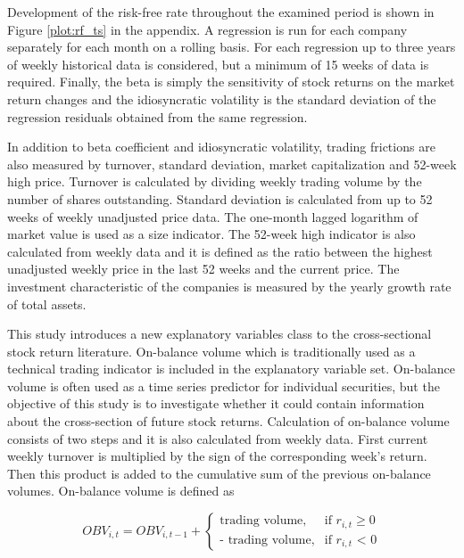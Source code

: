 \documentclass[12pt]{article}
\begin{document}
Development of the risk-free rate throughout the examined period is shown in Figure \ref{plot:rf_ts} in the appendix. A regression is run for each company separately for each month on a rolling basis. For each regression up to three years of weekly historical data is considered, but a minimum of 15 weeks of data is required. Finally, the beta is simply the sensitivity of stock returns on the market return changes and the idiosyncratic volatility is the standard deviation of the regression residuals obtained from the same regression. \par

In addition to beta coefficient and idiosyncratic volatility, trading frictions are also measured by turnover, standard deviation, market capitalization and 52-week high price. Turnover is calculated by dividing weekly trading volume by the number of shares outstanding. Standard deviation is calculated from up to 52 weeks of weekly unadjusted price data. The one-month lagged logarithm of market value is used as a size indicator. The 52-week high indicator is also calculated from weekly data and it is defined as the ratio between the highest unadjusted weekly price in the last 52 weeks and the current price. The investment characteristic of the companies is measured by the yearly growth rate of total assets. \par

This study introduces a new explanatory variables class to the cross-sectional stock return literature. On-balance volume which is traditionally used as a technical trading indicator is included in the explanatory variable set. On-balance volume is often used as a time series predictor for individual securities, but the objective of this study is to investigate whether it could contain information about the cross-section of future stock returns. Calculation of on-balance volume consists of two steps and it is also calculated from weekly data. First current weekly turnover is multiplied by the sign of the corresponding week's return. Then this product is added to the cumulative sum of the previous on-balance volumes. On-balance volume is defined as \par

\begin{equation}
\label{eq:OBV}
OBV_{i, t} = OBV_{i, t-1} + 
\begin{cases}
    \text{trading volume}, 	& \text{if $r_{i, t}$} \geq \text{0}\\
    \text{- trading volume},	& \text{if $r_{i, t}$ < 0}
\end{cases}
\end{equation}
\end{document}
